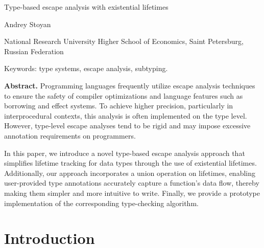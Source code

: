 \documentclass[11pt]{article}
\begin{document}
    \begin{center}
        \LARGE
        Type-based escape analysis with existential lifetimes

        \small
        Andrey Stoyan

        National Research University Higher School of Economics, Saint Petersburg, Russian Federation

        Keywords: type systems, escape analysis, subtyping.
    \end{center}

    \textbf{Abstract.}
    Programming languages frequently utilize escape analysis techniques to ensure the safety of compiler optimizations and language features such as borrowing and effect systems.
    To achieve higher precision, particularly in interprocedural contexts, this analysis is often implemented on the type level.
    However, type-level escape analyses tend to be rigid and may impose excessive annotation requirements on programmers.

    In this paper, we introduce a novel type-based escape analysis approach that simplifies lifetime tracking for data types through the use of existential lifetimes.
    Additionally, our approach incorporates a union operation on lifetimes, enabling user-provided type annotations accurately capture a function’s data flow, thereby making them simpler and more intuitive to write.
    Finally, we provide a prototype implementation of the corresponding type-checking algorithm.


    \section{Introduction}




%
\end{document}
